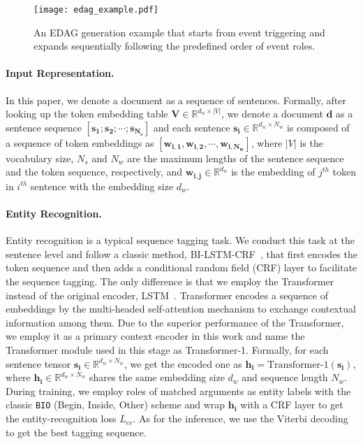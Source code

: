 \documentclass[11pt,a4paper]{article}
\newcommand{\R}{{\mathbb{R}}}
\begin{document}
\begin{figure}[t]
\centering
\texttt{[image: edag\_example.pdf]}
\caption{An EDAG generation example that starts from event triggering and expands sequentially following the predefined order of event roles.}
\label{fig:edag_example}
\end{figure}


\paragraph{Input Representation.}
In this paper, we denote a document as a sequence of sentences.
Formally, after looking up the token embedding table $\bm{V} \in \R^{d_w \times |V|}$,
we denote a document $\bm{d}$ as a sentence sequence $[\bm{s_1};\bm{s_2};\cdots;\bm{s_{N_s}}]$ and each sentence $\bm{s_i} \in \R^{d_w \times N_w}$ is composed of a sequence of token embeddings as $[\bm{w_{i,1}},\bm{w_{i,2}},\cdots,\bm{w_{i,N_w}}]$,
where $|V|$ is the vocabulary size,
$N_s$ and $N_w$ are the maximum lengths of the sentence sequence and the token sequence, respectively, 
and $\bm{w_{i,j}} \in \R^{d_w}$ is the embedding of $j^{th}$ token in $i^{th}$ sentence with the embedding size $d_w$.


\paragraph{Entity Recognition.}
Entity recognition is a typical sequence tagging task.
We conduct this task at the sentence level and follow a classic method, BI-LSTM-CRF~\cite{huang2015bidirectional}, that first encodes the token sequence and then adds a conditional random field (CRF) layer to facilitate the sequence tagging.
The only difference is that we employ the Transformer~\cite{vaswani2017attention} instead of the original encoder, LSTM~\cite{hochreiter1997long}.
Transformer encodes a sequence of embeddings by the multi-headed self-attention mechanism to exchange contextual information among them.
Due to the superior performance of the Transformer, we employ it as a primary context encoder in this work and name the Transformer module used in this stage as Transformer-1.
Formally, for each sentence tensor $\bm{s_i} \in \R^{d_w \times N_w}$,
we get the encoded one as $\bm{h_i} = \text{Transformer-1}(\bm{s_i})$,
where $\bm{h_i} \in \R^{d_w \times N_w}$ shares the same embedding size $d_w$ and sequence length $N_w$.
During training, we employ roles of matched arguments as entity labels with the classic \texttt{BIO} (Begin, Inside, Other) scheme and wrap $\bm{h_i}$ with a CRF layer to get the entity-recognition loss $L_{er}$.
As for the inference, we use the Viterbi decoding to get the best tagging sequence.
\end{document}
